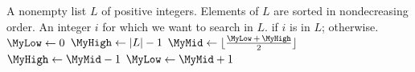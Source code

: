 
\begin{algorithmic}[1]
\Require A nonempty list $L$ of positive integers. Elements of $L$ are
  sorted in nondecreasing order. An integer $i$ for which we want to
  search in $L$.
\Ensure \MyTrue if $i$ is in $L$; \MyFalse otherwise.
\State $\MyLow \gets 0$
\State $\MyHigh \gets |L| - 1$
\While{$\MyLow \leq \MyHigh$}
  \State $\MyMid \gets \lfloor\frac{\MyLow\, +\, \MyHigh}{2}\rfloor$\label{alg:binary_search:mid_floor}
    \State \Return \MyTrue
  \EndIf
    \State $\MyHigh \gets \MyMid - 1$
  \Else
    \State $\MyLow \gets \MyMid + 1$
  \EndIf
\EndWhile
\State \Return \MyFalse
\end{algorithmic}

